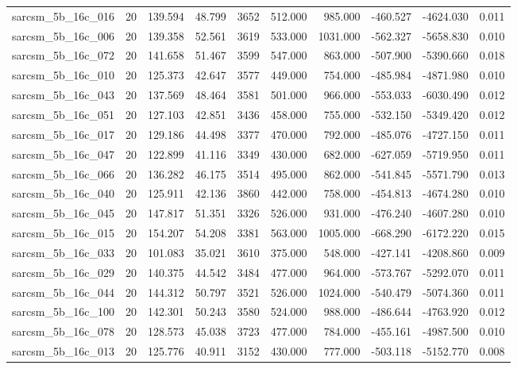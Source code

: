 \begin{tabular}{lrrrrrrrrr}
sarcsm\_5b\_16c\_016 & 20 & 139.594 & 48.799 & 3652 & 512.000 & 985.000 & -460.527 & -4624.030 & 0.011 \\
sarcsm\_5b\_16c\_006 & 20 & 139.358 & 52.561 & 3619 & 533.000 & 1031.000 & -562.327 & -5658.830 & 0.010 \\
sarcsm\_5b\_16c\_072 & 20 & 141.658 & 51.467 & 3599 & 547.000 & 863.000 & -507.900 & -5390.660 & 0.018 \\
sarcsm\_5b\_16c\_010 & 20 & 125.373 & 42.647 & 3577 & 449.000 & 754.000 & -485.984 & -4871.980 & 0.010 \\
sarcsm\_5b\_16c\_043 & 20 & 137.569 & 48.464 & 3581 & 501.000 & 966.000 & -553.033 & -6030.490 & 0.012 \\
sarcsm\_5b\_16c\_051 & 20 & 127.103 & 42.851 & 3436 & 458.000 & 755.000 & -532.150 & -5349.420 & 0.012 \\
sarcsm\_5b\_16c\_017 & 20 & 129.186 & 44.498 & 3377 & 470.000 & 792.000 & -485.076 & -4727.150 & 0.011 \\
sarcsm\_5b\_16c\_047 & 20 & 122.899 & 41.116 & 3349 & 430.000 & 682.000 & -627.059 & -5719.950 & 0.011 \\
sarcsm\_5b\_16c\_066 & 20 & 136.282 & 46.175 & 3514 & 495.000 & 862.000 & -541.845 & -5571.790 & 0.013 \\
sarcsm\_5b\_16c\_040 & 20 & 125.911 & 42.136 & 3860 & 442.000 & 758.000 & -454.813 & -4674.280 & 0.010 \\
sarcsm\_5b\_16c\_045 & 20 & 147.817 & 51.351 & 3326 & 526.000 & 931.000 & -476.240 & -4607.280 & 0.010 \\
sarcsm\_5b\_16c\_015 & 20 & 154.207 & 54.208 & 3381 & 563.000 & 1005.000 & -668.290 & -6172.220 & 0.015 \\
sarcsm\_5b\_16c\_033 & 20 & 101.083 & 35.021 & 3610 & 375.000 & 548.000 & -427.141 & -4208.860 & 0.009 \\
sarcsm\_5b\_16c\_029 & 20 & 140.375 & 44.542 & 3484 & 477.000 & 964.000 & -573.767 & -5292.070 & 0.011 \\
sarcsm\_5b\_16c\_044 & 20 & 144.312 & 50.797 & 3521 & 526.000 & 1024.000 & -540.479 & -5074.360 & 0.011 \\
sarcsm\_5b\_16c\_100 & 20 & 142.301 & 50.243 & 3580 & 524.000 & 988.000 & -486.644 & -4763.920 & 0.012 \\
sarcsm\_5b\_16c\_078 & 20 & 128.573 & 45.038 & 3723 & 477.000 & 784.000 & -455.161 & -4987.500 & 0.010 \\
sarcsm\_5b\_16c\_013 & 20 & 125.776 & 40.911 & 3152 & 430.000 & 777.000 & -503.118 & -5152.770 & 0.008 \\

\end{tabular}
